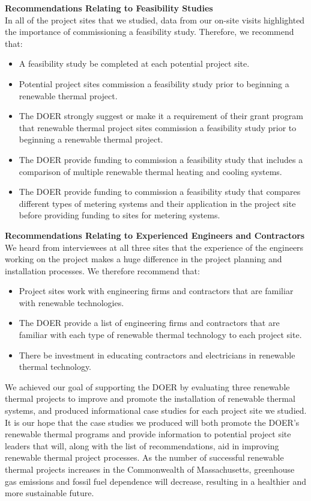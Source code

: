 \noindent
\textbf{Recommendations Relating to Feasibility Studies}\\
\indent In all of the project sites that we studied, data from our on-site visits highlighted the importance of commissioning a feasibility study. Therefore, we recommend that:
\begin{itemize}
  \item{A feasibility study be completed at each potential project site.}
  \item{Potential project sites commission a feasibility study prior to beginning a renewable thermal project.}
  \item{The DOER strongly suggest or make it a requirement of their grant program that renewable thermal project sites commission a feasibility study prior to beginning a renewable thermal project.}
  \item{The DOER provide funding to commission a feasibility study that includes a comparison of multiple renewable thermal heating and cooling systems.}
  \item{The DOER provide funding to commission a feasibility study that compares different types of metering systems and their application in the project site before providing funding to sites for metering systems.}
\end{itemize}

\noindent
\textbf{Recommendations Relating to Experienced Engineers and Contractors}\\
\indent We heard from interviewees at all three sites that the experience of the engineers working on the project makes a huge difference in the project planning and installation processes. We therefore recommend that:
\begin{itemize}
  \item{Project sites work with engineering firms and contractors that are familiar with renewable technologies.}
  \item{The DOER provide a list of engineering firms and contractors that are familiar with each type of renewable thermal technology to each project site.}
  \item{There be investment in educating contractors and electricians in renewable thermal technology.}
\end{itemize}

\par We achieved our goal of supporting the DOER by evaluating three renewable thermal projects to improve and promote the installation of renewable thermal systems, and produced informational case studies for each project site we studied. It is our hope that the case studies we produced will both promote the DOER's renewable thermal programs and provide information to potential project site leaders that will, along with the list of recommendations, aid in improving renewable thermal project processes. As the number of successful renewable thermal projects increases in the Commonwealth of Massachusetts, greenhouse gas emissions and fossil fuel dependence will decrease, resulting in a healthier and more sustainable future.
